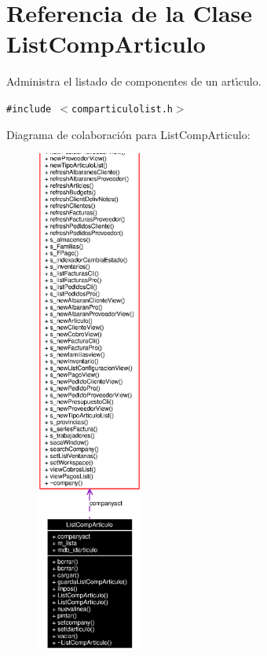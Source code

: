 \section{Referencia de la Clase List\-Comp\-Articulo}
\label{classListCompArticulo}
Administra el listado de componentes de un art\'{\i}culo.  


{\tt \#include $<$comparticulolist.h$>$}

Diagrama de colaboraci\'{o}n para List\-Comp\-Articulo:\begin{figure}[H]
\begin{center}
\leavevmode
\includegraphics[width=99pt]{classListCompArticulo__coll__graph}
\end{center}
\end{figure}

